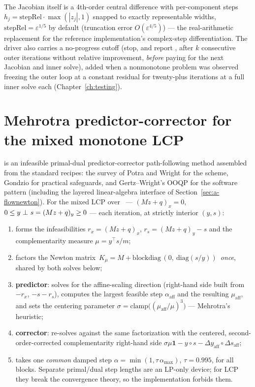 The Jacobian itself is a 4th-order central difference with per-component
steps $h_j = \mathrm{stepRel}\cdot\max(|z_j|, 1)$ snapped to exactly
representable widths, $\mathrm{stepRel} = \varepsilon^{1/5}$ by default
(truncation error $O(\varepsilon^{4/5})$) --- the real-arithmetic
replacement for the reference implementation's complex-step
differentiation. The driver also carries a no-progress cutoff (stop, and
report , after $k$ consecutive outer iterations
without relative improvement, \emph{before} paying for the next Jacobian
and inner solve), added when a nonmonotone problem was observed freezing
the outer loop at a constant residual for twenty-plus iterations at a full
inner solve each (Chapter~\ref{ch:testing}).

\section{Mehrotra predictor-corrector for the mixed monotone LCP}
\label{sec:a-ipm}

 is an infeasible primal-dual predictor-corrector
path-following method assembled from the standard recipes: the survey of
Potra and Wright \cite{potra2000} for the scheme, Gondzio \cite{gondzio2012}
for practical safeguards, and Gertz--Wright's OOQP \cite{gertz2003} for the
software pattern (including the layered linear-algebra interface of
Section~\ref{sec:a-flownewton}). For the mixed LCP over \K\ ---
$(Mz+q)_x = 0$, $0 \le y \ \bot\  s = (Mz+q)_y \ge 0$ --- each iteration, at
strictly interior $(y, s)$:

\begin{enumerate}
\item forms the infeasibilities $r_x = (Mz+q)_x$, $r_s = (Mz+q)_y - s$ and
  the complementarity measure $\mu = y^\top s / m$;
\item factors the Newton matrix
  $\,K_\mu = M + \mathrm{blockdiag}\,(0,\ \mathrm{diag}(s/y))\,$
  \emph{once}, shared by both solves below;
\item \textbf{predictor}: solves for the affine-scaling direction
  (right-hand side built from $-r_x$, $-s - r_s$), computes the largest
  feasible step $\alpha_{\mathrm{aff}}$ and the resulting
  $\mu_{\mathrm{aff}}$, and sets the centering parameter
  $\sigma = \mathrm{clamp}\bigl((\mu_{\mathrm{aff}}/\mu)^3\bigr)$ ---
  Mehrotra's heuristic;
\item \textbf{corrector}: re-solves against the same factorization with the
  centered, second-order-corrected complementarity right-hand side
  $\sigma\mu\mathbf{1} - y \circ s - \Delta y_{\mathrm{aff}} \circ
  \Delta s_{\mathrm{aff}}$;
\item takes one \emph{common} damped step
  $\alpha = \min(1, \tau\,\alpha_{\max})$, $\tau = 0.995$, for all blocks.
  Separate primal/dual step lengths are an LP-only device; for LCP they
  break the convergence theory, so the implementation forbids them.
\end{enumerate}

